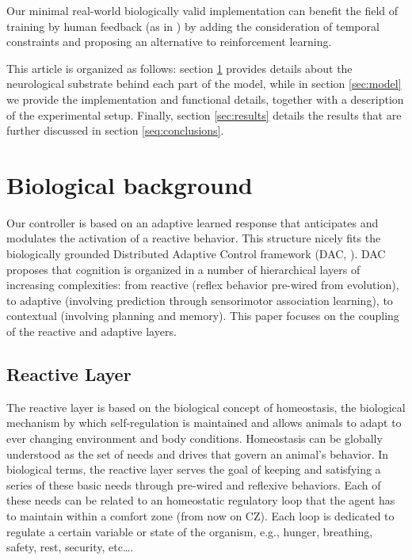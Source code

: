 \documentclass[letterpaper, 10 pt, conference]{ieeeconf}  %
\begin{document}
Our minimal real-world biologically valid implementation can benefit the field of training by human feedback (as in \cite{knox2013training}) by adding the consideration of temporal constraints and proposing an alternative to reinforcement learning. 


This article is organized as follows: section \ref{sec:bio} provides details about the neurological substrate behind each part of the model, while in section \ref{sec:model} we provide the implementation and functional details, together with a description of the experimental setup. Finally, section \ref{sec:results} details the results that are further discussed in section \ref{seq:conclusions}. 


\section{Biological background}
\label{sec:bio}

Our controller is based on an adaptive learned response that anticipates and modulates the activation of a reactive behavior. 
This structure nicely fits the biologically grounded Distributed Adaptive Control framework (DAC, \cite{verschure2003environmentally,verschure2014why}). DAC proposes that cognition is organized in a number of hierarchical layers of increasing complexities: from reactive (reflex behavior pre-wired from evolution), to adaptive (involving prediction through sensorimotor association learning), to contextual (involving planning and memory). This paper focuses on the coupling of the reactive and adaptive layers. 

\subsection{Reactive Layer}
\label{sec:reactive_bio}

The reactive layer is based on the biological concept of homeostasis, the biological mechanism by which self-regulation is maintained and allows animals to adapt to ever changing environment and body conditions. Homeostasis can be globally understood as the set of needs and drives that govern an animal's behavior. In biological terms, the reactive layer serves the goal of keeping and satisfying a series of these basic needs through pre-wired and reflexive behaviors. Each of these needs can be related to an homeostatic regulatory loop that the agent has to maintain within a comfort zone (from now on CZ). Each loop is dedicated to regulate a certain variable or state of the organism, e.g., hunger, breathing, safety, rest, security, etc\ldots. 
\end{document}
